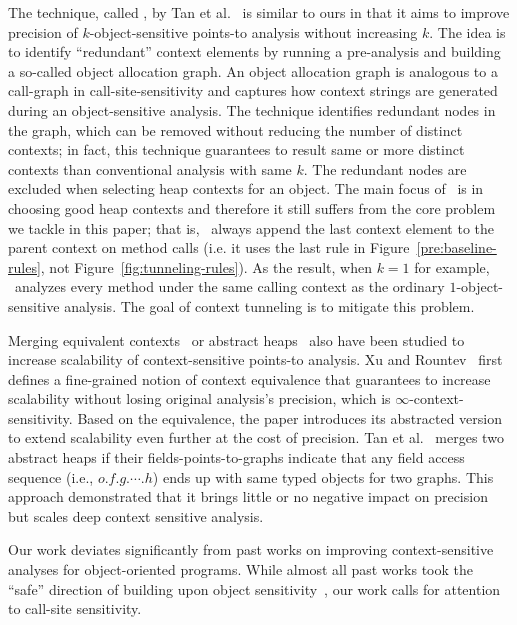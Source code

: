 The technique, called \Bean, by Tan et al.~\cite{TanLX16} is similar to ours in
that it aims to improve precision of $k$-object-sensitive points-to
analysis without increasing $k$. The idea is to identify ``redundant''
context elements by running a pre-analysis and building a so-called
object allocation graph. An object allocation graph is analogous to a
call-graph in call-site-sensitivity and captures how context strings
are generated during an object-sensitive analysis. The technique
identifies redundant nodes in the graph, which can be removed without
reducing the number of distinct contexts; in fact, this technique
guarantees to result same or more distinct contexts than conventional
analysis with same $k$. The redundant nodes are excluded when
selecting heap contexts for an object. The main focus of \Bean~is in
choosing good heap contexts and therefore it still suffers from the
core problem we tackle in this paper; that is, \Bean~always append the
last context element to the parent context on method calls (i.e. it
uses the last rule in Figure~\ref{pre:baseline-rules}, not
Figure~\ref{fig:tunneling-rules}). As the result, when $k=1$ for
example, \Bean~analyzes every method under the same calling context as
the ordinary $1$-object-sensitive analysis. The goal of context
tunneling is to mitigate this problem.

Merging equivalent contexts~\cite{Xu2008} or abstract heaps~\cite{Tan2017} also have been studied to
increase scalability of context-sensitive points-to analysis. Xu and Rountev~\cite{Xu2008} first defines a fine-grained
notion of context equivalence that guarantees to increase scalability without losing original analysis's
precision, which is $\infty$-context-sensitivity. Based on the equivalence, the paper introduces its abstracted
version to extend scalability even further at the cost of precision. Tan et al.~\cite{Tan2017} merges two
abstract heaps if their fields-points-to-graphs indicate that any field access sequence (i.e.,
$o.f.g.\cdots .h$) ends up with same typed objects for two graphs. This approach demonstrated that it brings
little or no negative impact on precision but scales deep context
sensitive analysis.









Our work deviates significantly from past works on improving context-sensitive analyses for object-oriented programs. 
While almost all past works took the ``safe'' direction of building upon object 
sensitivity~\cite{Smaragdakis2011,SridharanDCST12,TanLX16,Li2018b,Smaragdakis2014,Li2018a,JeJeChOh17,Liang2011,Liang2011learning,Lu:2019:PYF}, our
work calls for attention to call-site sensitivity.


